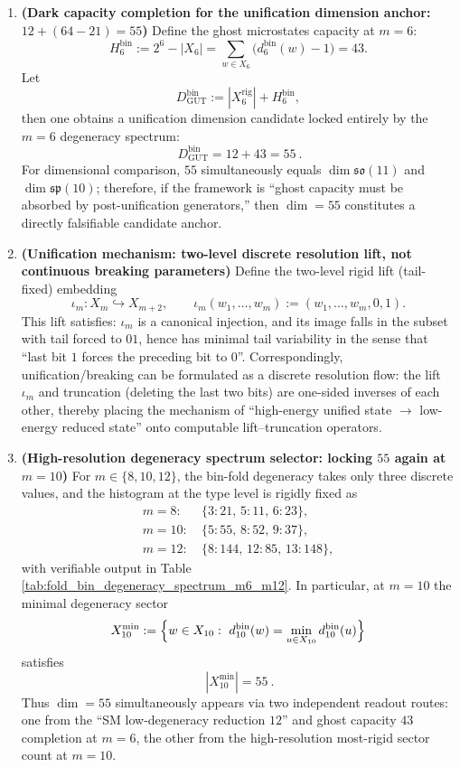 \begin{enumerate}
  \item \textbf{(Dark capacity completion for the unification dimension anchor: \(12+(64-21)=55\))}
  Define the ghost microstates capacity at \(m=6\):
  \[
  H^{\mathrm{bin}}_6:=2^6-|X_6|
  =\sum_{w\in X_6}\bigl(d^{\mathrm{bin}}_6(w)-1\bigr)
  =43.
  \]
  Let
  \[
  D^{\mathrm{bin}}_{\mathrm{GUT}}:=|X^{\mathrm{rig}}_6|+H^{\mathrm{bin}}_6,
  \]
  then one obtains a unification dimension candidate locked entirely by the \(m=6\) degeneracy spectrum:
  \[
  \boxed{\ D^{\mathrm{bin}}_{\mathrm{GUT}}=12+43=55\ }.
  \]
  For dimensional comparison, \(55\) simultaneously equals \(\dim\mathfrak{so}(11)\) and \(\dim\mathfrak{sp}(10)\);
  therefore, if the framework is ``ghost capacity must be absorbed by post-unification generators,'' then \(\dim=55\) constitutes a directly falsifiable candidate anchor.
  \item \textbf{(Unification mechanism: two-level discrete resolution lift, not continuous breaking parameters)}
  Define the two-level rigid lift (tail-fixed) embedding
  \[
  \iota_m:X_m\hookrightarrow X_{m+2},\qquad
  \iota_m(w_1,\dots,w_m):=(w_1,\dots,w_m,0,1).
  \]
  This lift satisfies: \(\iota_m\) is a canonical injection, and its image falls in the subset with tail forced to \(01\),
  hence has minimal tail variability in the sense that ``last bit \(1\) forces the preceding bit to \(0\)''.
  Correspondingly, unification/breaking can be formulated as a discrete resolution flow: the lift \(\iota_m\) and truncation (deleting the last two bits) are one-sided inverses of each other,
  thereby placing the mechanism of ``high-energy unified state \(\to\) low-energy reduced state'' onto computable lift--truncation operators.
  \item \textbf{(High-resolution degeneracy spectrum selector: locking \(55\) again at \(m=10\))}
  For \(m\in\{8,10,12\}\), the bin-fold degeneracy takes only three discrete values, and the histogram at the type level is rigidly fixed as
  \[
  \begin{aligned}
  m=8:\ &\{3:21,\,5:11,\,6:23\},\\
  m=10:\ &\{5:55,\,8:52,\,9:37\},\\
  m=12:\ &\{8:144,\,12:85,\,13:148\},
  \end{aligned}
  \]
  with verifiable output in Table \ref{tab:fold_bin_degeneracy_spectrum_m6_m12}.
  In particular, at \(m=10\) the minimal degeneracy sector
  \[
  X^{\min}_{10}:=\Bigl\{w\in X_{10}:\ d^{\mathrm{bin}}_{10}(w)=\min_{u\in X_{10}} d^{\mathrm{bin}}_{10}(u)\Bigr\}
  \]
  satisfies
  \[
  \boxed{\ |X^{\min}_{10}|=55\ }.
  \]
  Thus \(\dim=55\) simultaneously appears via two independent readout routes:
  one from the ``SM low-degeneracy reduction \(12\)'' and ghost capacity \(43\) completion at \(m=6\),
  the other from the high-resolution most-rigid sector count at \(m=10\).
  
\end{enumerate}





